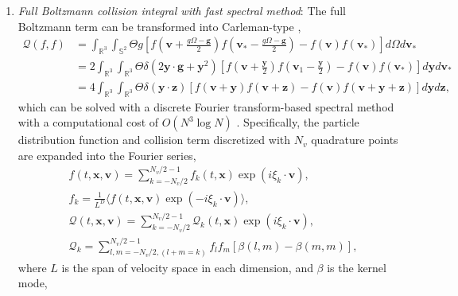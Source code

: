\documentclass[preprint,3p,12pt,sort&compress]{elsarticle}
\begin{document}
\begin{enumerate}
  \item[(1)] \textit{Full Boltzmann collision integral with fast spectral method}: The full Boltzmann term can be transformed into Carleman-type \cite{carleman1944integrale},
  \begin{equation}
    \begin{aligned}
    \mathcal Q(f,f)
    &=\int_{\mathbb{R}^{3}} \int_{\mathbb{S}^{2}} \Theta g\left[f\left(\mathbf{v}+\frac{g \Omega-\mathbf{g}}{2}\right) f\left(\mathbf{v}_{*}-\frac{g \Omega-\mathbf{g}}{2}\right)-f(\mathbf{v}) f\left(\mathbf{v}_{*}\right)\right] d \Omega d \mathbf{v}_{*} \\
    &=2 \int_{\mathbb{R}^{3}} \int_{\mathbb{R}^{3}} \Theta \delta\left(2 \mathbf{y} \cdot \mathbf{g}+\mathbf{y}^{2}\right)\left[f\left(\mathbf{v}+\frac{\mathbf{y}}{2}\right) f\left(\mathbf{v}_{1}-\frac{\mathbf{y}}{2}\right)-f(\mathbf{v}) f\left(\mathbf{v}_{*}\right)\right] d \mathbf{y} d \mathbf{v}_{*} \\
    &=4 \int_{\mathbb{R}^{3}} \int_{\mathbb{R}^{3}} \Theta \delta(\mathbf{y} \cdot \mathbf{z})[f(\mathbf{v}+\mathbf{y}) f(\mathbf{v}+\mathbf{z})-f(\mathbf{v}) f(\mathbf{v}+\mathbf{y}+\mathbf{z})] d \mathbf{y} d \mathbf{z},
    \end{aligned}
    \label{eqn:carleman}
    \end{equation}
    which can be solved with a discrete Fourier transform-based spectral method with a computational cost of $O(N^3 \log N)$ \cite{mouhot2006fast}.
  Specifically, the particle distribution function and collision term discretized with $N_v$ quadrature points are expanded into the Fourier series,
    \begin{equation}
    \begin{aligned}
        &f(t,\mathbf x,\mathbf{v})=\sum_{k=-N_v / 2}^{N_v / 2-1} {f}_{k}(t,\mathbf x) \exp \left(i \xi_{k} \cdot \mathbf{v}\right),\\
        &{f}_{k}=\frac{1}{L^{D}} \langle f(t,\mathbf x,\mathbf{v}) \exp \left(-i \xi_{k} \cdot \mathbf{v}\right) \rangle,\\
        &\mathcal Q(t,\mathbf x,\mathbf{v})=\sum_{k=-N_v / 2}^{N_v / 2-1} \mathcal{Q}_{k}(t,\mathbf x) \exp \left(i \xi_{k} \cdot \mathbf{v}\right),\\
        &\mathcal{Q}_{k}=\sum_{l, m=-N_v / 2,(l+m=k)}^{N_v / 2-1} {f}_{l} {f}_{m} [\beta(l, m)-\beta(m, m)],
    \end{aligned}
    \end{equation}
  where $L$ is the span of velocity space in each dimension, and $\beta$ is the kernel mode,

\end{enumerate}
\end{document}
